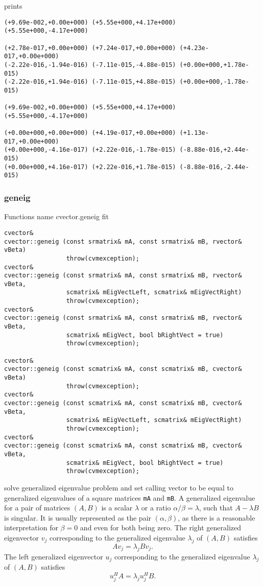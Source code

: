 prints
\begin{Verbatim}
(+9.69e-002,+0.00e+000) (+5.55e+000,+4.17e+000) (+5.55e+000,-4.17e+000)

(+2.78e-017,+0.00e+000) (+7.24e-017,+0.00e+000) (+4.23e-017,+0.00e+000)
(-2.22e-016,-1.94e-016) (-7.11e-015,-4.88e-015) (+0.00e+000,+1.78e-015)
(-2.22e-016,+1.94e-016) (-7.11e-015,+4.88e-015) (+0.00e+000,-1.78e-015)

(+9.69e-002,+0.00e+000) (+5.55e+000,+4.17e+000) (+5.55e+000,-4.17e+000)

(+0.00e+000,+0.00e+000) (+4.19e-017,+0.00e+000) (+1.13e-017,+0.00e+000)
(+0.00e+000,-4.16e-017) (+2.22e-016,-1.78e-015) (-8.88e-016,+2.44e-015)
(+0.00e+000,+4.16e-017) (+2.22e-016,+1.78e-015) (-8.88e-016,-2.44e-015)
\end{Verbatim}
\newpage


\subsubsection{geneig}
Functions%
\pdfdest name {cvector.geneig} fit
\begin{verbatim}
cvector& 
cvector::geneig (const srmatrix& mA, const srmatrix& mB, rvector& vBeta)
                 throw(cvmexception);
cvector& 
cvector::geneig (const srmatrix& mA, const srmatrix& mB, rvector& vBeta,
                 scmatrix& mEigVectLeft, scmatrix& mEigVectRight) 
                 throw(cvmexception);
cvector& 
cvector::geneig (const srmatrix& mA, const srmatrix& mB, rvector& vBeta,
                 scmatrix& mEigVect, bool bRightVect = true)
                 throw(cvmexception);

cvector& 
cvector::geneig (const scmatrix& mA, const scmatrix& mB, cvector& vBeta)
                 throw(cvmexception);
cvector& 
cvector::geneig (const scmatrix& mA, const scmatrix& mB, cvector& vBeta,
                 scmatrix& mEigVectLeft, scmatrix& mEigVectRight)
                 throw(cvmexception);
cvector& 
cvector::geneig (const scmatrix& mA, const scmatrix& mB, cvector& vBeta,
                 scmatrix& mEigVect, bool bRightVect = true)
                 throw(cvmexception);
\end{verbatim}
solve generalized eigenvalue problem and
set  calling vector to be equal to generalized eigenvalues
of a square matrices \verb"mA" and  \verb"mB".
A generalized eigenvalue for a pair of matrices $(A,B)$ is a scalar $\lambda$ or a ratio $\alpha / \beta = \lambda$, 
such that $A - \lambda B$ is singular. It is usually represented as the pair $(\alpha, \beta)$, 
as there is a reasonable interpretation for $\beta =0$ and even for both being zero.
The right generalized eigenvector $v_j$ corresponding to the generalized eigenvalue $\lambda_j$ of $(A,B)$ satisfies
\begin{equation*}
A v_j = \lambda_j B v_j.
\end{equation*}
The left generalized eigenvector $u_j$ corresponding to the generalized eigenvalue $\lambda_j$ of $(A,B)$ satisfies
\begin{equation*}
u_j^H A = \lambda_j u_j^H B.
\end{equation*}

